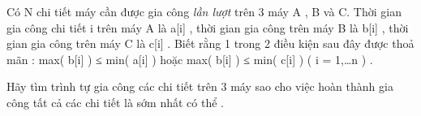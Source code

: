 Có N chi tiết máy cần được gia công   \textit{    lần lượt   }   trên 3 máy A , B và C. Thời gian gia công chi tiết i trên máy A là  a[i] , thời gian gia công trên máy B là b[i] , thời gian gia công trên máy C là c[i] . Biết rằng 1 trong 2 điều kiện sau đây được thoả mãn : max( b[i] ) ≤ min( a[i] ) hoặc max( b[i] ) ≤ min( c[i] ) ( i = 1,…n ) .   


   Hãy tìm trình tự gia công các chi tiết trên 3 máy sao cho việc hoàn thành gia công tất cả các chi tiết là sớm nhất có thể .